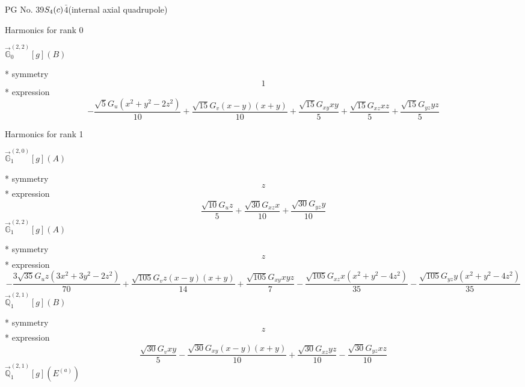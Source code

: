 \documentclass[fleqn,8pt]{jsarticle}
\begin{document}
\setcounter{MaxMatrixCols}{32}

\renewcommand{\tablename}{Table~}
\renewcommand{\figurename}{Figure~}
\begin{center}
\LARGE
PG No. 39\quad$S_{\rm 4}(c)$\quad$\bar{4}$\quad[ tetragonal ] (internal axial quadrupole)
\end{center}

\noindent * Harmonics for rank 0

\noindent\quad $\vec{\mathbb{G}}_{0}^{(2,2)}[g](B)$

\noindent\quad ** symmetry
\begin{dmath*}
1
\end{dmath*}
\noindent\quad ** expression
\begin{dmath*}
- \frac{\sqrt{5} G_{u} \left(x^{2} + y^{2} - 2 z^{2}\right)}{10} + \frac{\sqrt{15} G_{v} \left(x - y\right) \left(x + y\right)}{10} + \frac{\sqrt{15} G_{xy} x y}{5} + \frac{\sqrt{15} G_{xz} x z}{5} + \frac{\sqrt{15} G_{yz} y z}{5}
\end{dmath*}

\noindent * Harmonics for rank 1

\noindent\quad $\vec{\mathbb{G}}_{1}^{(2,0)}[g](A)$

\noindent\quad ** symmetry
\begin{dmath*}
z
\end{dmath*}
\noindent\quad ** expression
\begin{dmath*}
\frac{\sqrt{10} G_{u} z}{5} + \frac{\sqrt{30} G_{xz} x}{10} + \frac{\sqrt{30} G_{yz} y}{10}
\end{dmath*}
\noindent\quad $\vec{\mathbb{G}}_{1}^{(2,2)}[g](A)$

\noindent\quad ** symmetry
\begin{dmath*}
z
\end{dmath*}
\noindent\quad ** expression
\begin{dmath*}
- \frac{3 \sqrt{35} G_{u} z \left(3 x^{2} + 3 y^{2} - 2 z^{2}\right)}{70} + \frac{\sqrt{105} G_{v} z \left(x - y\right) \left(x + y\right)}{14} + \frac{\sqrt{105} G_{xy} x y z}{7} - \frac{\sqrt{105} G_{xz} x \left(x^{2} + y^{2} - 4 z^{2}\right)}{35} - \frac{\sqrt{105} G_{yz} y \left(x^{2} + y^{2} - 4 z^{2}\right)}{35}
\end{dmath*}
\noindent\quad $\vec{\mathbb{Q}}_{1}^{(2,1)}[g](B)$

\noindent\quad ** symmetry
\begin{dmath*}
z
\end{dmath*}
\noindent\quad ** expression
\begin{dmath*}
\frac{\sqrt{30} G_{v} x y}{5} - \frac{\sqrt{30} G_{xy} \left(x - y\right) \left(x + y\right)}{10} + \frac{\sqrt{30} G_{xz} y z}{10} - \frac{\sqrt{30} G_{yz} x z}{10}
\end{dmath*}
\noindent\quad $\vec{\mathbb{Q}}_{1}^{(2,1)}[g](E^{(a)})$
\end{document}
